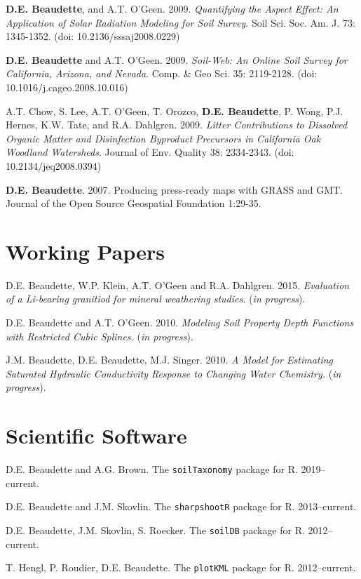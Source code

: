 \documentclass[overlapped,line,10pt,letterpaper]{res}
\begin{document}
\begin{resume}
\textbf{D.E. Beaudette}, and A.T. O'Geen. 2009. {\em Quantifying the Aspect Effect: An Application of Solar Radiation Modeling for Soil Survey}. Soil Sci. Soc. Am. J. 73: 1345-1352. (doi: 10.2136/sssaj2008.0229)

\textbf{D.E. Beaudette} and A.T. O'Geen. 2009. {\em Soil-Web: An Online Soil Survey for California, Arizona, and Nevada}. Comp. \& Geo Sci. 35: 2119-2128. (doi: 10.1016/j.cageo.2008.10.016)

A.T. Chow, S. Lee, A.T. O'Geen, T. Orozco, \textbf{D.E. Beaudette}, P. Wong, P.J. Hernes, K.W. Tate, and R.A. Dahlgren. 2009. {\em Litter Contributions to Dissolved Organic Matter and Disinfection Byproduct Precursors in California Oak Woodland Watersheds}. Journal of Env. Quality 38: 2334-2343. (doi: 10.2134/jeq2008.0394)

\textbf{D.E. Beaudette}. 2007. Producing press-ready maps with GRASS and GMT. Journal of the Open Source Geospatial Foundation 1:29-35.

\section{\bf Working Papers}
D.E. Beaudette, W.P. Klein, A.T. O'Geen and R.A. Dahlgren. 2015. {\em Evaluation of a Li-bearing granitiod for mineral weathering studies.} (\textit{in progress}).

D.E. Beaudette and A.T. O'Geen.  2010. {\em Modeling Soil Property Depth Functions with Restricted Cubic Splines.} (\textit{in progress}).

J.M. Beaudette, D.E. Beaudette, M.J. Singer. 2010. {\em A Model for Estimating Saturated Hydraulic Conductivity Response to Changing Water Chemistry.} (\textit{in progress}).

\section{\bf Scientific Software}
D.E. Beaudette and A.G. Brown. The \texttt{soilTaxonomy} package for R. 2019--current.

D.E. Beaudette and J.M. Skovlin. The \texttt{sharpshootR} package for R. 2013--current.

D.E. Beaudette, J.M. Skovlin, S. Roecker. The \texttt{soilDB} package for R. 2012--current.

T. Hengl, P. Roudier, D.E. Beaudette. The \texttt{plotKML} package for R. 2012--current.


\end{resume}
\end{document}
